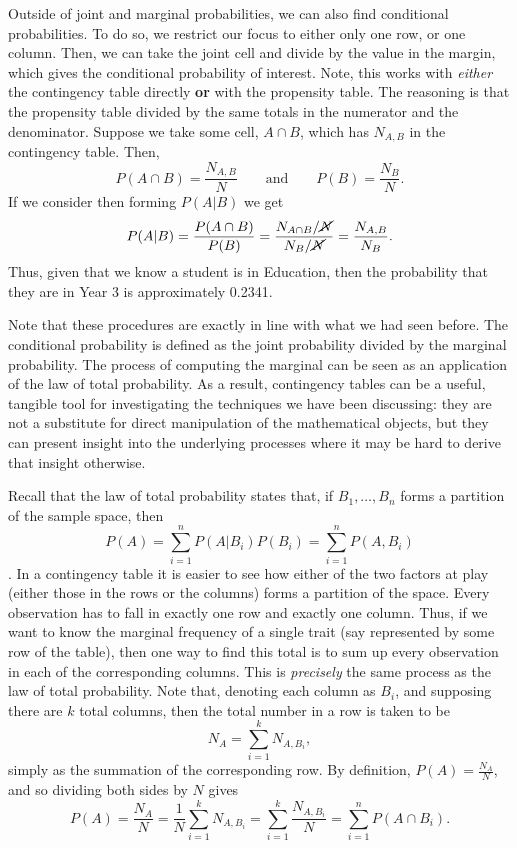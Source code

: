 \documentclass[
  letterpaper,
  DIV=11,
  numbers=noendperiod]{scrreprt}
\theoremstyle{definition}
\theoremstyle{definition}
\theoremstyle{definition}
\theoremstyle{remark}
\begin{document}
Outside of joint and marginal probabilities, we can also find
conditional probabilities. To do so, we restrict our focus to either
only one row, or one column. Then, we can take the joint cell and divide
by the value in the margin, which gives the conditional probability of
interest. Note, this works with \emph{either} the contingency table
directly \textbf{or} with the propensity table. The reasoning is that
the propensity table divided by the same totals in the numerator and the
denominator. Suppose we take some cell, \(A\cap B\), which has
\(N_{A, B}\) in the contingency table. Then,
\[P(A\cap B) = \frac{N_{A, B}}{N} \quad\quad\text{and}\quad\quad P(B) = \frac{N_B}{N}.\]
If we consider then forming \(P(A|B)\) we get
\[P(A|B) = \frac{P(A \cap B)}{P(B)} = \frac{N_{A \cap B}/\cancel{N}}{N_B/\cancel{N}} = \frac{N_{A, B}}{N_B}.\]
Thus, given that we know a student is in Education, then the probability
that they are in Year 3 is approximately 0.2341.

Note that these procedures are exactly in line with what we had seen
before. The conditional probability is defined as the joint probability
divided by the marginal probability. The process of computing the
marginal can be seen as an application of the law of total probability.
As a result, contingency tables can be a useful, tangible tool for
investigating the techniques we have been discussing: they are not a
substitute for direct manipulation of the mathematical objects, but they
can present insight into the underlying processes where it may be hard
to derive that insight otherwise.

\begin{tcolorbox}[enhanced jigsaw, coltitle=black, colframe=quarto-callout-warning-color-frame, colbacktitle=quarto-callout-warning-color!10!white, bottomrule=.15mm, opacitybacktitle=0.6, colback=white, toptitle=1mm, arc=.35mm, leftrule=.75mm, bottomtitle=1mm, opacityback=0, breakable, rightrule=.15mm, title={The Law of Total Probability: Contingency Table's Version}, left=2mm, titlerule=0mm, toprule=.15mm]

Recall that the law of total probability states that, if
\(B_1,\dots,B_n\) forms a partition of the sample space, then
\[P(A) = \sum_{i=1}^n P(A|B_i)P(B_i) = \sum_{i=1}^n P(A, B_i)\]. In a
contingency table it is easier to see how either of the two factors at
play (either those in the rows or the columns) forms a partition of the
space. Every observation has to fall in exactly one row and exactly one
column. Thus, if we want to know the marginal frequency of a single
trait (say represented by some row of the table), then one way to find
this total is to sum up every observation in each of the corresponding
columns. This is \emph{precisely} the same process as the law of total
probability. Note that, denoting each column as \(B_i\), and supposing
there are \(k\) total columns, then the total number in a row is taken
to be \[N_A = \sum_{i=1}^k N_{A, B_i},\] simply as the summation of the
corresponding row. By definition, \(P(A) = \frac{N_A}{N}\), and so
dividing both sides by \(N\) gives
\[P(A) = \frac{N_A}{N} = \frac{1}{N}\sum_{i=1}^k N_{A, B_i} = \sum_{i=1}^k \frac{N_{A, B_i}}{N} = \sum_{i=1}^n P(A\cap B_i).\]

\end{tcolorbox}
\end{document}
